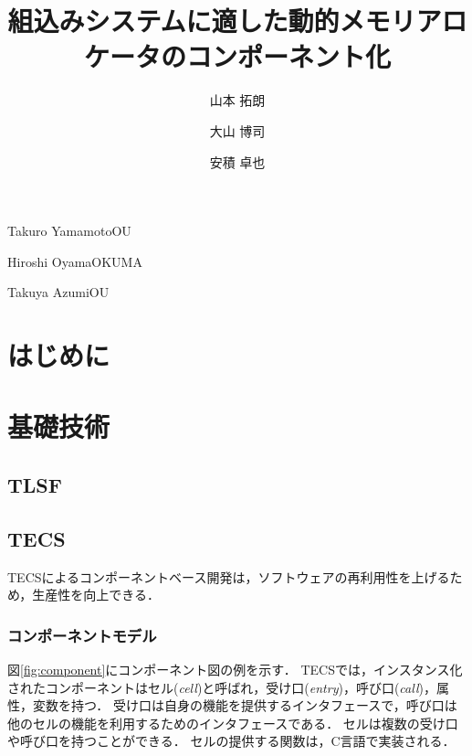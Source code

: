 \documentclass[submit]{ipsj_v2/UTF8/ipsj}
\begin{document}
\title{組込みシステムに適した動的メモリアロケータのコンポーネント化}




\author{山本 拓朗}{Takuro Yamamoto}{OU}%
\author{大山 博司}{Hiroshi Oyama}{OKUMA}%
\author{安積 卓也}{Takuya Azumi}{OU}%

\maketitle

\section{はじめに}

\section{基礎技術}
\label{sec:Background}

\subsection{TLSF}

\subsection{TECS}
TECSによるコンポーネントベース開発は，ソフトウェアの再利用性を上げるため，生産性を向上できる．


\subsubsection{コンポーネントモデル}
図\ref{fig:component}にコンポーネント図の例を示す．
TECSでは，インスタンス化されたコンポーネントはセル({\it cell})と呼ばれ，受け口({\it entry})，呼び口({\it call})，属性，変数を持つ．
受け口は自身の機能を提供するインタフェースで，呼び口は他のセルの機能を利用するためのインタフェースである．
セルは複数の受け口や呼び口を持つことができる．
セルの提供する関数は，C言語で実装される．
\end{document}
